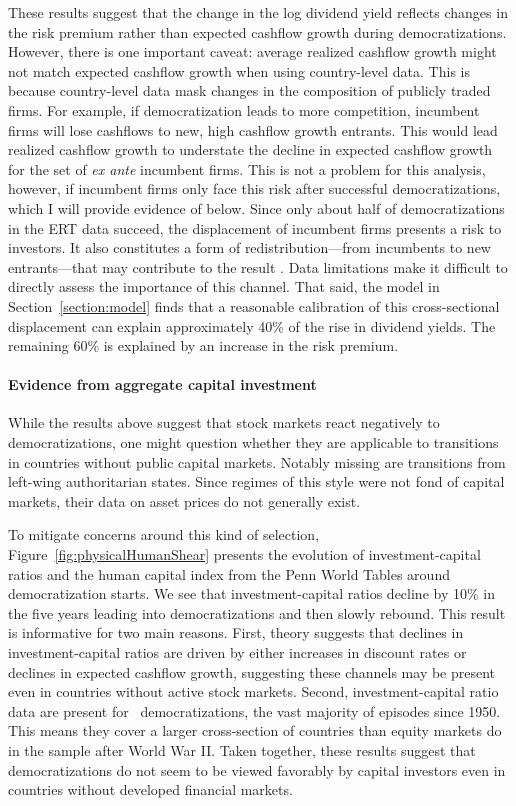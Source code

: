\label{par:expected_cashflows_growth}
These results suggest that the change in the log dividend yield reflects changes in the risk premium rather than expected cashflow growth during democratizations. However, there is one important caveat: average realized cashflow growth might not match expected cashflow growth when using country-level data. This is because country-level data mask changes in the composition of publicly traded firms. For example, if democratization leads to more competition, incumbent firms will lose cashflows to new, high cashflow growth entrants. This would lead realized cashflow growth to understate the decline in expected cashflow growth for the set of \textit{ex ante} incumbent firms. This is not a problem for this analysis, however, if incumbent firms only face this risk after successful democratizations, which I will provide evidence of below. Since only about half of democratizations in the ERT data succeed, the displacement of incumbent firms presents a risk to investors. It also constitutes a form of redistribution---from incumbents to new entrants---that may contribute to the result \citep*{Fisman2001,Garleanu2012}. Data limitations make it difficult to directly assess the importance of this channel. That said, the model in Section~\ref{section:model} finds that a reasonable calibration of this cross-sectional displacement can explain approximately 40\% of the rise in dividend yields. The remaining 60\% is explained by an increase in the risk premium.

\paragraph{Evidence from aggregate capital investment}\label{par:agg_invest_beg}
While the results above suggest that stock markets react negatively to democratizations, one might question whether they are applicable to transitions in countries without public capital markets. Notably missing are transitions from left-wing authoritarian states. Since regimes of this style were not fond of capital markets, their data on asset prices do not generally exist.

To mitigate concerns around this kind of selection, Figure~\ref{fig:physicalHumanShear} presents the evolution of investment-capital ratios and the human capital index from the Penn World Tables around democratization starts. We see that investment-capital ratios decline by 10\% in the five years leading into democratizations and then slowly rebound. This result is informative for two main reasons. First, theory suggests that declines in investment-capital ratios are driven by either increases in discount rates or declines in expected cashflow growth, suggesting these channels may be present even in countries without active stock markets. Second, investment-capital ratio data are present for \demEpisodesIK\ democratizations, the vast majority of episodes since 1950. This means they cover a larger cross-section of countries than equity markets do in the sample after World War II. Taken together, these results suggest that democratizations do not seem to be viewed favorably by capital investors even in countries without developed financial markets.

